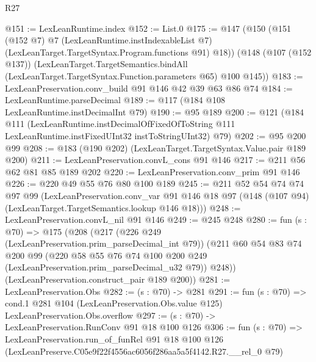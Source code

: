 \begin{lexlean}{R27}
\begin{coremodule}
@151 := LexLeanRuntime.index
@152 := List.{0}
@175 := @147
    (@150
      (@151
        (@152 @7)
        @7
        (LexLeanRuntime.instIndexableList @7)
        (LexLeanTarget.TargetSyntax.Program.functions @91)
        @18))
    (@148
      (@107 (@152 @137))
      (LexLeanTarget.TargetSemantics.bindAll
        (LexLeanTarget.TargetSyntax.Function.parameters @65)
        @100
        @145))
@183 := LexLeanPreservation.conv_build @91 @146 @42 @39 @63 @86 @74
@184 := LexLeanRuntime.parseDecimal
@189 := @117 (@184 @108 LexLeanRuntime.instDecimalInt @79)
@190 := @95 @189
@200 := @121
    (@184
      @111
      (LexLeanRuntime.instDecimalOfFixedOfToString
        @111
        LexLeanRuntime.instFixedUInt32
        instToStringUInt32)
      @79)
@202 := @95 @200 @99
@208 := @183 (@190 @202) (LexLeanTarget.TargetSyntax.Value.pair @189 @200)
@211 := LexLeanPreservation.convL_cons @91 @146
@217 := @211 @56 @62 @81 @85 @189 @202
@220 := LexLeanPreservation.conv_prim @91 @146
@226 := @220 @49 @55 @76 @80 @100 @189
@245 := @211
    @52
    @54
    @74
    @74
    @97
    @99
    (LexLeanPreservation.conv_var
      @91
      @146
      @18
      @97
      (@148 (@107 @94) (LexLeanTarget.TargetSemantics.lookup @146 @18)))
@248 := LexLeanPreservation.convL_nil @91 @146
@249 := @245 @248
@280 := fun (s : @70) =>
  @175
    (@208
      (@217
        (@226 @249 (LexLeanPreservation.prim_parseDecimal_int @79))
        (@211
          @60
          @54
          @83
          @74
          @200
          @99
          (@220 @58 @55 @76 @74 @100 @200 @249 (LexLeanPreservation.prim_parseDecimal_u32 @79))
          @248))
      (LexLeanPreservation.construct_pair @189 @200))
@281 := LexLeanPreservation.Obs
@282 := (s : @70) -> @281
@291 := fun (s : @70) =>
  cond.{1} @281 @104 (LexLeanPreservation.Obs.value @125) LexLeanPreservation.Obs.overflow
@297 := (s : @70) -> LexLeanPreservation.RunConv @91 @18 @100 @126
@306 := fun (s : @70) =>
  LexLeanPreservation.run_of_funRel
    @91
    @18
    @100
    @126
    (LexLeanPreserve.C05e9f22f4556ac6056f286aa5a5f4142.R27.__rel_0 @79)
\end{coremodule}
\end{lexlean}

